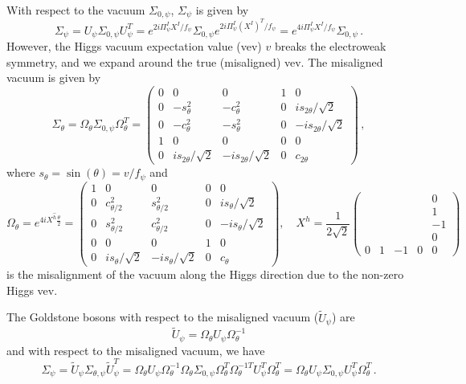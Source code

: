 \documentclass[preprintnumbers,nofootinbib,showpacs,eqsecnum,pre,12pt]{revtex4-1}
\newcommand{\vev}{vev}
\begin{document}
With respect to the vacuum $\Sigma_{0,\psi}$, $\Sigma_\psi$ is given by
\begin{equation}
\Sigma_\psi = U_\psi\Sigma_{0,\psi} U_\psi^T =  e^{2i\Pi^I_\psi X^I/f_\psi} \Sigma_{0,\psi}  e^{2i\Pi^I_\psi(X^I)^T/f_\psi} =e^{4i\Pi^I_\psi X^I/f_\psi} \Sigma_{0,\psi}  \, .
\end{equation}
However, the Higgs vacuum expectation value (\vev) $v$ breaks the electroweak symmetry, and we expand around the true (misaligned) \vev. The misaligned vacuum is given by 
\begin{equation}
\Sigma_\theta = \Omega_\theta \Sigma_{0,\psi} \Omega_\theta^T = 
\begin{pmatrix}
0 & 0 & 0 & 1 & 0 \\
0 & -s^2_\theta & -c^2_\theta & 0 & i s_{2\theta} / \sqrt{2} \\
0  & -c^2_\theta & -s^2_\theta &0 & -i s_{2\theta} / \sqrt{2} \\
1 & 0 & 0 & 0 & 0 \\
0 &  i s_{2\theta} / \sqrt{2}  & -i s_{2\theta} / \sqrt{2} & 0 & c_{2\theta}
\end{pmatrix} \, ,
\end{equation}
where $s_\theta = \sin (\theta) = v / f_\psi$ and 
\begin{equation}
\Omega_\theta = e^{4iX^{\hat{h}}\frac{\theta}{2}} =\begin{pmatrix}
1 & 0 & 0 & 0 & 0 \\
0 & {c^2_{\theta/2}} & {s^2_{\theta/2}} & 0 & i s_{\theta} / \sqrt{2} \\
0  & {s^2_{\theta/2}} & {c^2_{\theta/2}} &0 & -i s_{\theta} / \sqrt{2} \\
0 & 0 & 0 & 1 & 0 \\
0 &  i s_{\theta} / \sqrt{2}  & -i s_{\theta} / \sqrt{2} & 0 & c_{\theta}
\end{pmatrix} , \quad
X^{\hat h}= \frac{1}{2\sqrt{2}}
\begin{pmatrix}
	&&&&0\\&&&&1\\&&&&-1\\&&&&0\\0&1&-1&0&0
\end{pmatrix}
\end{equation}
is the misalignment of the vacuum along the Higgs direction due to the non-zero Higgs \vev.

The Goldstone bosons with respect to the misaligned vacuum ($\tilde{U}_\psi$) are
\begin{equation}
\tilde{U}_\psi = \Omega_\theta U_\psi \Omega^{-1}_\theta 
\label{eq:Utrue}
\end{equation}
and with respect to the misaligned vacuum, we have 
\begin{equation}
\Sigma_\psi = \tilde{U}_\psi\Sigma_{\theta,\psi} \tilde{U}_\psi^T = \Omega_\theta U_\psi \Omega^{-1}_\theta \Omega_\theta  \Sigma_{0,\psi} \Omega^T_\theta \Omega^{-1 T}_\theta U^T_\psi  \Omega^{T}_\theta = \Omega_\theta U_\psi \Sigma_{0,\psi} U^T_\psi  \Omega^{T}_\theta \, .
\end{equation}
\end{document}
